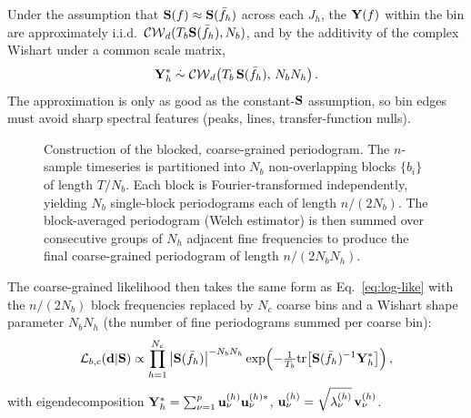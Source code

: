 \documentclass[%
	reprint,
	nofootinbib,
	amsmath,
	amssymb,
	aps,
]{revtex4-2}
\begin{document}
	Under the assumption that $\S(f)\approx\S(\bar{f}_{h})$ across each $J_{h}$,
	the $\Y(f)$ within the bin are approximately i.i.d.\
	$\mathcal{CW}_{d}(T_b\S(\bar{f}_{h}), N_{b})$, and by the additivity of the
	complex Wishart under a common scale matrix,
	\begin{equation}
		\Y_{h}^{*}\;\dot\sim\;\mathcal{CW}_{d}\!\left(T_b\,\S(\bar{f}_{h}),\, N_{b}N_{h}\right).
	\end{equation}
	The approximation is only as good as the constant-$\S$ assumption, so bin
	edges must avoid sharp spectral features (peaks, lines, transfer-function
	nulls).

	\begin{figure}[!t]
		\centering
		\resizebox{\linewidth}{!}{}
		\caption{Construction of the blocked, coarse-grained periodogram.
			The $n$-sample timeseries is partitioned into $N_{b}$
			non-overlapping blocks $\{b_{i}\}$ of length $T/N_{b}$. Each
			block is Fourier-transformed independently, yielding $N_{b}$
			single-block periodograms each of length $n/(2N_{b})$. The
			block-averaged periodogram (Welch estimator) is then summed
			over consecutive groups of $N_{h}$ adjacent fine frequencies to
			produce the final coarse-grained periodogram of length
			$n/(2N_{b}N_{h})$.}
		\label{fig:blocked_likelihood}
	\end{figure}

	The coarse-grained likelihood then takes the same form as
	Eq.~\eqref{eq:log-like} with the $n/(2N_{b})$ block frequencies
	replaced by $N_{c}$ coarse bins and a Wishart shape parameter
	$N_{b}N_{h}$ (the number of fine periodograms summed per coarse
	bin):
	\begin{equation}
		\label{eq:log-like-coarse}
		\mathcal{L}_{b,c}(\d|\S)
		\propto \prod_{h=1}^{N_{c}} \left|\S(\bar{f}_{h})\right|^{-N_{b}N_{h}}
		\exp\!\left(-\tfrac{1}{T_{b}}\tr\!\left[\S(\bar{f}_{h})^{-1}\Y_{h}^{*}\right]\right),
	\end{equation}
	with eigendecomposition $\Y_{h}^{*}=\sum_{\nu=1}^{p}
	\u^{(h)}_{\nu}\u^{(h)*}_{\nu}$,
	$\u^{(h)}_{\nu}=\sqrt{\lambda^{(h)}_{\nu}}\,\v^{(h)}_{\nu}$.
\end{document}
